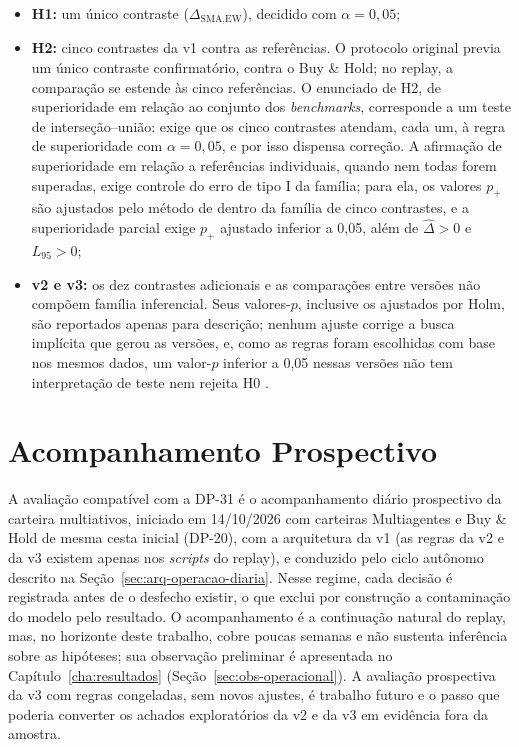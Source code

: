 \begin{itemize}
    \item \textbf{H1:} um único contraste ($\Delta_{\text{SMA},\text{EW}}$), decidido com $\alpha = 0{,}05$;
    \item \textbf{H2:} cinco contrastes da v1 contra as referências. O protocolo original previa um único contraste confirmatório, contra o Buy \& Hold; no replay, a comparação se estende às cinco referências. O enunciado de H2, de superioridade em relação ao conjunto dos \textit{benchmarks}, corresponde a um teste de interseção--união: exige que os cinco contrastes atendam, cada um, à regra de superioridade com $\alpha = 0{,}05$, e por isso dispensa correção. A afirmação de superioridade em relação a referências individuais, quando nem todas forem superadas, exige controle do erro de tipo I da família; para ela, os valores $p_{+}$ são ajustados pelo método de \citet{Holm1979} dentro da família de cinco contrastes, e a superioridade parcial exige $p_{+}$ ajustado inferior a 0,05, além de $\hat{\Delta} > 0$ e $L_{95} > 0$;
    \item \textbf{v2 e v3:} os dez contrastes adicionais e as comparações entre versões não compõem família inferencial. Seus valores-$p$, inclusive os ajustados por Holm, são reportados apenas para descrição; nenhum ajuste corrige a busca implícita que gerou as versões, e, como as regras foram escolhidas com base nos mesmos dados, um valor-$p$ inferior a 0,05 nessas versões não tem interpretação de teste nem rejeita H0 \citep{White2000, Bailey2017}.
\end{itemize}

\section{Acompanhamento Prospectivo}
\label{sec:met-prospectivo}

A avaliação compatível com a \mbox{DP-31} é o acompanhamento diário prospectivo da carteira multiativos, iniciado em 14/10/2026 com carteiras Multiagentes e Buy \& Hold de mesma cesta inicial (\mbox{DP-20}), com a arquitetura da v1 (as regras da v2 e da v3 existem apenas nos \textit{scripts} do replay), e conduzido pelo ciclo autônomo descrito na Seção~\ref{sec:arq-operacao-diaria}. Nesse regime, cada decisão é registrada antes de o desfecho existir, o que exclui por construção a contaminação do modelo pelo resultado. O acompanhamento é a continuação natural do replay, mas, no horizonte deste trabalho, cobre poucas semanas e não sustenta inferência sobre as hipóteses; sua observação preliminar é apresentada no Capítulo~\ref{cha:resultados} (Seção~\ref{sec:obs-operacional}). A avaliação prospectiva da v3 com regras congeladas, sem novos ajustes, é trabalho futuro e o passo que poderia converter os achados exploratórios da v2 e da v3 em evidência fora da amostra.

